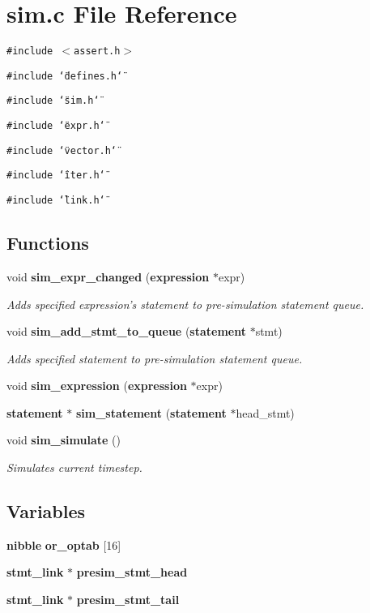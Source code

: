 \section{sim.c File Reference}
\label{sim_8c}
{\tt \#include $<$assert.h$>$}\par
{\tt \#include \char`\"{}defines.h\char`\"{}}\par
{\tt \#include \char`\"{}sim.h\char`\"{}}\par
{\tt \#include \char`\"{}expr.h\char`\"{}}\par
{\tt \#include \char`\"{}vector.h\char`\"{}}\par
{\tt \#include \char`\"{}iter.h\char`\"{}}\par
{\tt \#include \char`\"{}link.h\char`\"{}}\par
\subsection*{Functions}
\begin{CompactItemize}
\item 
void {\bf sim\_\-expr\_\-changed} ({\bf expression} $\ast$expr)
\begin{CompactList}\small\item\em Adds specified expression's statement to pre-simulation statement queue.\item\end{CompactList}\item 
void {\bf sim\_\-add\_\-stmt\_\-to\_\-queue} ({\bf statement} $\ast$stmt)
\begin{CompactList}\small\item\em Adds specified statement to pre-simulation statement queue.\item\end{CompactList}\item 
void {\bf sim\_\-expression} ({\bf expression} $\ast$expr)
\item 
{\bf statement} $\ast$ {\bf sim\_\-statement} ({\bf statement} $\ast$head\_\-stmt)
\item 
void {\bf sim\_\-simulate} ()
\begin{CompactList}\small\item\em Simulates current timestep.\item\end{CompactList}\end{CompactItemize}
\subsection*{Variables}
\begin{CompactItemize}
\item 
{\bf nibble} {\bf or\_\-optab} [16]
\item 
{\bf stmt\_\-link} $\ast$ {\bf presim\_\-stmt\_\-head}
\item 
{\bf stmt\_\-link} $\ast$ {\bf presim\_\-stmt\_\-tail}
\end{CompactItemize}


